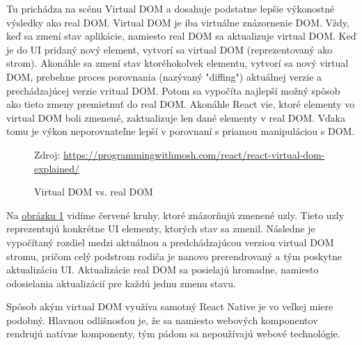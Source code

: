 Tu prichádza na scénu Virtual DOM a dosahuje podstatne lepšie výkonostné výsledky ako real DOM. Virtual DOM je iba virtuálne znázornenie DOM. Vždy, keď sa zmení stav aplikácie, namiesto real DOM sa aktualizuje virtual DOM. Keď je do UI pridaný nový element, vytvorí sa virtual DOM (reprezentovaný ako strom). Akonáhle sa zmení stav ktoréhokoľvek elementu, vytvorí sa nový virtual DOM, prebehne proces porovnania (nazývaný "diffing") aktuálnej verzie a prechádzajúcej verzie vritual DOM. Potom sa vypočíta najlepší možný spôsob ako tieto zmeny premietnuť do real DOM. Akonáhle React vie, ktoré elementy vo virtual DOM boli zmenené, zaktualizuje len dané elementy v real DOM. Vďaka tomu je výkon neporovnateľne lepší v porovnaní s priamou manipuláciou s DOM.

\begin{figure}[!htbp]
  \centering  
  \def\stackalignment{c}
           {\scriptsize%
            Zdroj: \url{https://programmingwithmosh.com/react/react-virtual-dom-explained/}}
	\caption{Virtual DOM vs. real DOM}  
  \label{domImg}
\end{figure}
Na \hyperref[domImg]{obrázku \ref{domImg}} vidíme červené kruhy, ktoré znázorňujú zmenené uzly. Tieto uzly reprezentujú konkrétne UI elementy, ktorých stav sa zmenil. Následne je vypočítaný rozdiel medzi aktuálnou a predchádzajúcou verziou virtual DOM stromu, pričom celý podstrom rodiča je nanovo prerendrovaný a tým poskytne aktualizáciu UI. Aktualizácie real DOM sa posielajú hromadne, namiesto odosielania aktualizácií pre každú jednu zmenu stavu.

Spôsob akým virtual DOM využíva samotný React Native je vo veľkej miere podobný. Hlavnou odlišnosťou je, že sa namiesto webových komponentov rendrujú natívne komponenty, tým pádom sa nepoužívajú webové technológie. \\

